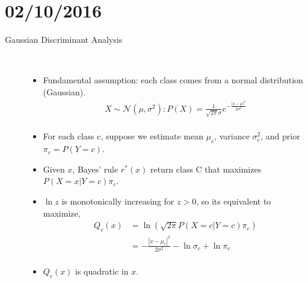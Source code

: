 \documentclass[10pt]{article}
\begin{document}
\section*{02/10/2016}
\begin{description}
	\item[Gaussian Discriminant Analysis]
		\
		\begin{itemize}
			\item Fundamental assumption: each class comes from a normal distribution (Gaussian).
				\begin{align*}
					X \sim \mathcal{N}(\mu, \sigma^{2}):
					P(X) = \frac{1}{\sqrt{2\pi}\sigma} e^{-\frac{|x-\mu|^{2}}{2\sigma^{2}}}\\ 
				\end{align*}
			\item For each class c, suppose we estimate mean $\mu_{c}$, variance $\sigma_{c}^{2}$, and prior $\pi_{c} = P(Y=c)$.
			\item Given $x$, Bayes' rule $r^{*}(x)$ return class C that maximizes $P(X=x|Y=c)\pi_{c}$.
			\item $\ln z$ is monotonically increasing for $z > 0$, so its equivalent to maximize,
				\begin{align*}
					Q_{c}(x) &= \ln(\sqrt{2\pi}P(X=c|Y=c)\pi_{c})\\
							&= -\frac{|x-\mu_{c}|^{2}}{2\sigma^{2}} - \ln \sigma_{c} + \ln \pi_{c}\\
				\end{align*}
			\item $Q_{c}(x)$ is quadratic in $x$.
		\end{itemize}
	

\end{description}
\end{document}
